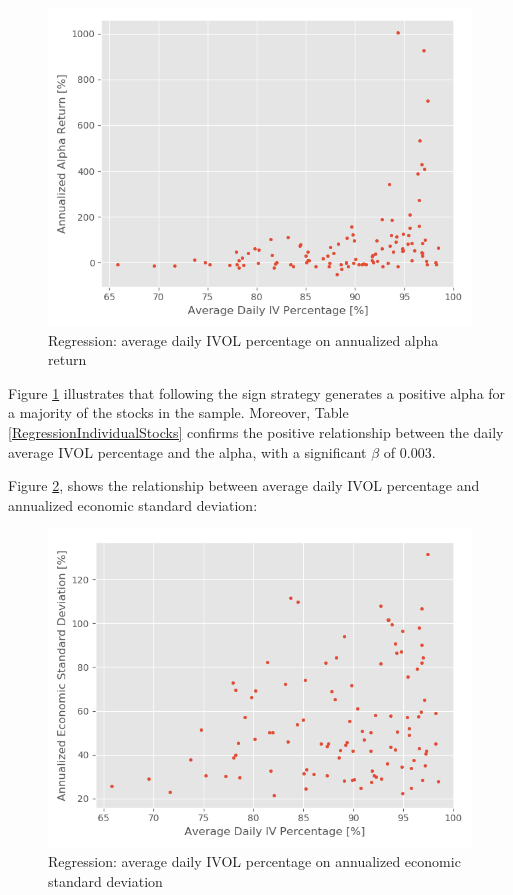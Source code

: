 \begin{figure}[h]
    \centering
    \includegraphics[scale = 0.5]{Plot/IndividualStockRegression2.png}
    \caption{Regression: average daily IVOL percentage on annualized alpha return}
    \label{IVAlphaRegression}
\end{figure}

Figure \ref{IVAlphaRegression} illustrates that following the sign strategy generates a positive alpha for a majority of the stocks in the sample. Moreover, Table \ref{RegressionIndividualStocks} confirms the positive relationship between the daily average IVOL percentage and the alpha, with a significant $\beta$ of $0.003$. 

Figure \ref{IVtoVol}, shows the relationship between average daily IVOL percentage and annualized economic standard deviation:

\begin{figure}[h]
    \centering
    \includegraphics[scale = 0.5]{Plot/IVvsEconomicVolatilityRegression.png}
    \caption{Regression: average daily IVOL percentage on annualized economic standard deviation}
    \label{IVtoVol}
\end{figure}

